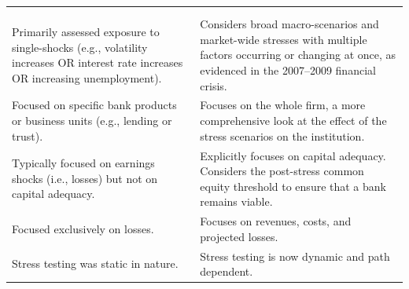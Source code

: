 


\noindent\begin{minipage}{\textwidth}
\renewcommand{\arraystretch}{1.32}
\begin{tabularx}{\textwidth}{@{}YY@{}}
\\
  & \\
{\tabfont Primarily assessed exposure to single-shocks (e.g., volatility
increases OR interest rate increases OR increasing unemployment).} &
{\tabfont Considers broad macro-scenarios and market-wide stresses with multiple
factors occurring or changing at once, as evidenced in the 2007--2009 financial
crisis.}\\
{\tabfont Focused on specific bank products or business units (e.g., lending or
trust).} &
{\tabfont Focuses on the whole firm, a more comprehensive look at the effect of
the stress scenarios on the institution.}\\
{\tabfont Typically focused on earnings shocks (i.e., losses) but not on capital
adequacy.} &
{\tabfont Explicitly focuses on capital adequacy. Considers the post-stress
common equity threshold to ensure that a bank remains viable.}\\
{\tabfont Focused exclusively on losses.} &
{\tabfont Focuses on revenues, costs, and projected losses.}\\
{\tabfont Stress testing was static in nature.} &
{\tabfont Stress testing is now dynamic and path dependent.}\\
\end{tabularx}
\end{minipage}



